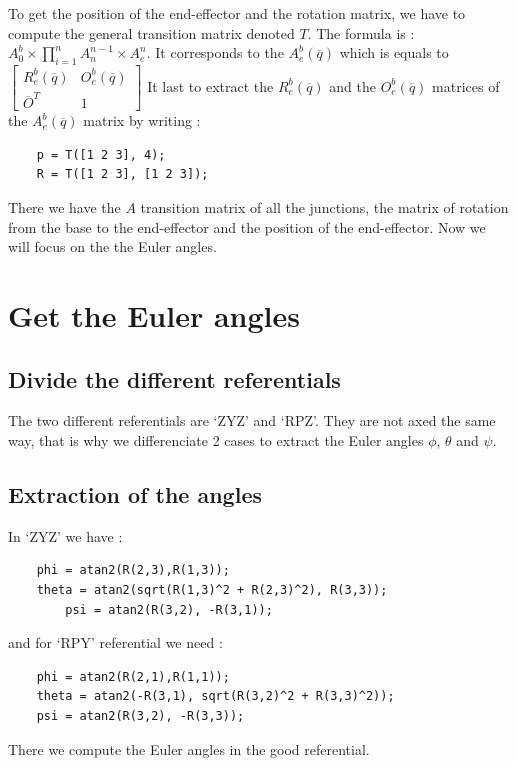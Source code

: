\documentclass[english,a4paper,11pt]{report}
\begin{document}
	To get the position of the end-effector and the rotation matrix, we have to compute the general transition matrix denoted $T$. The formula is : $A^b_0\times\prod_{i=1}^n A^{n-1}_n\times A^n_e$.
	It corresponds to the $A^b_e(\overline{q})$ which is equals to 
	$\begin{bmatrix} 
	R^b_e(\overline{q}) & O^b_e(\overline{q})\\
	\overline{O}^T & 1
	\end{bmatrix} $
	It last to extract the $R^b_e(\overline{q})$ and the $O^b_e(\overline{q})$ matrices of the $A^b_e(\overline{q})$ matrix by writing :
	\begin{lstlisting}
	p = T([1 2 3], 4);
	R = T([1 2 3], [1 2 3]);
	 \end{lstlisting}
	 
	 There we have the $A$ transition matrix of all the junctions, the matrix of rotation from the base to the end-effector and the position of the end-effector. Now we will focus on the the Euler angles.
	 
	 
	 \section{Get the Euler angles}
	\subsection{Divide the different referentials}
		The two different referentials are \lq{}ZYZ\rq{} and \lq{}RPZ\rq{}. They are not axed the same way, that is why we differenciate 2 cases to extract the Euler angles $\phi$, $\theta$ and $\psi$.
		
	\subsection{Extraction of the angles}
	In \lq{}ZYZ\rq{} we have :
	\begin{lstlisting}
	phi = atan2(R(2,3),R(1,3));
	theta = atan2(sqrt(R(1,3)^2 + R(2,3)^2), R(3,3));
        psi = atan2(R(3,2), -R(3,1));
	\end{lstlisting}	
	
	and for \lq{}RPY\rq{} referential we need :
	\begin{lstlisting}
	phi = atan2(R(2,1),R(1,1)); 
	theta = atan2(-R(3,1), sqrt(R(3,2)^2 + R(3,3)^2));
	psi = atan2(R(3,2), -R(3,3));
	\end{lstlisting}
	
	There we compute the Euler angles in the good referential.

	\listoffigures
	
\end{document}
